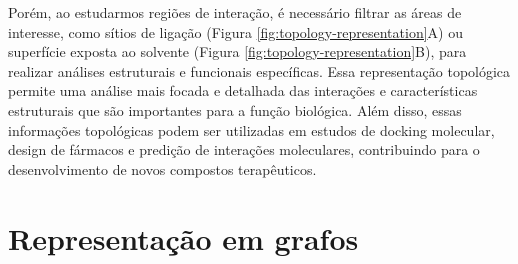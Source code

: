 \documentclass[Portugues]{phdquali}
\begin{document}

Porém, ao estudarmos regiões de interação, é necessário filtrar as áreas de interesse, como sítios de ligação (Figura \ref{fig:topology-representation}A) ou superfície exposta ao solvente (Figura \ref{fig:topology-representation}B), para realizar análises estruturais e funcionais específicas. Essa representação topológica permite uma análise mais focada e detalhada das interações e características estruturais que são importantes para a função biológica. Além disso, essas informações topológicas podem ser utilizadas em estudos de docking molecular, design de fármacos e predição de interações moleculares, contribuindo para o desenvolvimento de novos compostos terapêuticos.

\section{Representação em grafos}



\end{document}
